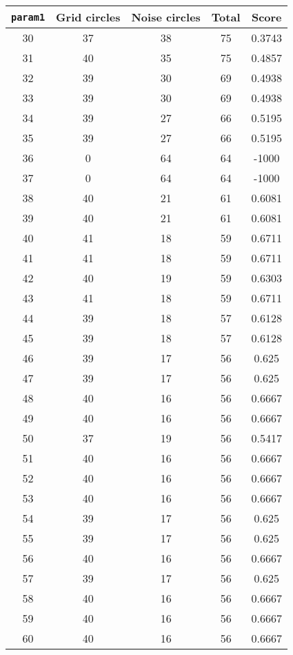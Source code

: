 \documentclass[letterpaper, 12pt]{article}
\begin{document}
\begin{longtable}{|c|c|c|c|c|}
\hline
\textbf{\texttt{param1}} & \textbf{Grid circles} & \textbf{Noise circles} & \textbf{Total} & \textbf{Score} \\
\hline
30 & 37 & 38 & 75 & 0.3743 \\
\hline
31 & 40 & 35 & 75 & 0.4857 \\
\hline
32 & 39 & 30 & 69 & 0.4938 \\
\hline
33 & 39 & 30 & 69 & 0.4938 \\
\hline
34 & 39 & 27 & 66 & 0.5195 \\
\hline
35 & 39 & 27 & 66 & 0.5195 \\
\hline
36 & 0 & 64 & 64 & -1000 \\
\hline
37 & 0 & 64 & 64 & -1000 \\
\hline
38 & 40 & 21 & 61 & 0.6081 \\
\hline
39 & 40 & 21 & 61 & 0.6081 \\
\hline
40 & 41 & 18 & 59 & 0.6711 \\
\hline
41 & 41 & 18 & 59 & 0.6711 \\
\hline
42 & 40 & 19 & 59 & 0.6303 \\
\hline
43 & 41 & 18 & 59 & 0.6711 \\
\hline
44 & 39 & 18 & 57 & 0.6128 \\
\hline
45 & 39 & 18 & 57 & 0.6128 \\
\hline
46 & 39 & 17 & 56 & 0.625 \\
\hline
47 & 39 & 17 & 56 & 0.625 \\
\hline
48 & 40 & 16 & 56 & 0.6667 \\
\hline
49 & 40 & 16 & 56 & 0.6667 \\
\hline
50 & 37 & 19 & 56 & 0.5417 \\
\hline
51 & 40 & 16 & 56 & 0.6667 \\
\hline
52 & 40 & 16 & 56 & 0.6667 \\
\hline
53 & 40 & 16 & 56 & 0.6667 \\
\hline
54 & 39 & 17 & 56 & 0.625 \\
\hline
55 & 39 & 17 & 56 & 0.625 \\
\hline
56 & 40 & 16 & 56 & 0.6667 \\
\hline
57 & 39 & 17 & 56 & 0.625 \\
\hline
58 & 40 & 16 & 56 & 0.6667 \\
\hline
59 & 40 & 16 & 56 & 0.6667 \\
\hline
60 & 40 & 16 & 56 & 0.6667 \\

\end{longtable}
\end{document}
